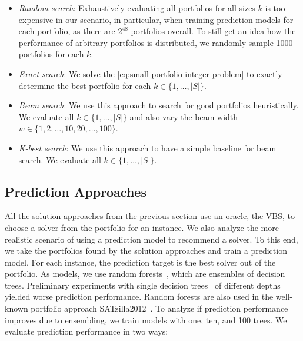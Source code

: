 \documentclass[conference]{IEEEtran}
\begin{document}
\begin{itemize}
	\item \emph{Random search}:
	Exhaustively evaluating all portfolios for all sizes $k$ is too expensive in our scenario, in particular, when training prediction models for each portfolio, as there are $2^{48}$ portfolios overall.
	To still get an idea how the performance of arbitrary portfolios is distributed, we randomly sample 1000 portfolios for each $k$.
	\item \emph{Exact search}:
	We solve the \ref{eq:small-portfolio-integer-problem} to exactly determine the best portfolio for each $k \in \{1, \dots, |S|\}$.
	\item \emph{Beam search}:
	We use this approach to search for good portfolios heuristically.
	We evaluate all $k \in \{1, \dots, |S|\}$ and also vary the beam width $w \in \{1, 2, \dots, 10, 20, \dots, 100\}$.
	\item \emph{K-best search}:
	We use this approach to have a simple baseline for beam search.
	We evaluate all $k \in \{1, \dots, |S|\}$.
\end{itemize}

\subsection{Prediction Approaches}

All the solution approaches from the previous section use an oracle, the VBS, to choose a solver from the portfolio for an instance.
We also analyze the more realistic scenario of using a prediction model to recommend a solver.
To this end, we take the portfolios found by the solution approaches and train a prediction model.
For each instance, the prediction target is the best solver out of the portfolio.
As models, we use random forests~\cite{breiman2001random}, which are ensembles of decision trees.
Preliminary experiments with single decision trees~\cite{breiman1984classification} of different depths yielded worse prediction performance.
Random forests are also used in the well-known portfolio approach SATzilla2012~\cite{xu2012satzilla2012}.
To analyze if prediction performance improves due to ensembling, we train models with one, ten, and 100 trees.
We evaluate prediction performance in two ways:
\end{document}
